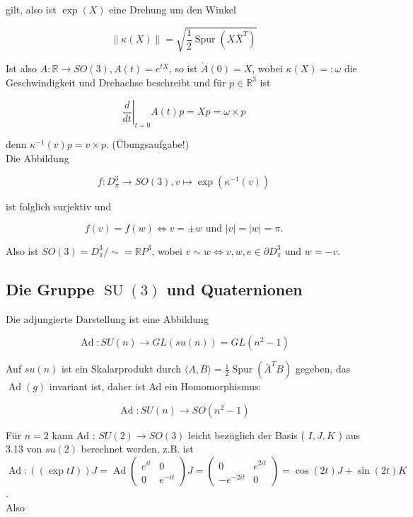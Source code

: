 \documentclass[10pt, letterpaper]{article}
\begin{document}
gilt, also ist $\exp (X)$ eine Drehung um den Winkel

$$
\|\kappa(X)\|=\sqrt{\frac{1}{2} \operatorname{Spur}\left(X \bar{X}^{T}\right)}
$$

Ist also $A: \mathbb{R} \rightarrow S O(3), A(t)=e^{t X}$, so ist $\dot{A}(0)=X$, wobei $\kappa(X)=: \omega$ die Geschwindigkeit und Drehachse beschreibt und für $p \in \mathbb{R}^{3}$ ist

$$
\left.\frac{d}{d t}\right|_{t=0} A(t) p=X p=\omega \times p
$$

denn $\kappa^{-1}(v) p=v \times p$. (Übungsaufgabe!)\\
Die Abbildung

$$
f: D_{\pi}^{3} \rightarrow S O(3), v \mapsto \exp \left(\kappa^{-1}(v)\right)
$$

ist folglich surjektiv und

$$
f(v)=f(w) \Leftrightarrow v= \pm w \text { und }|v|=|w|=\pi .
$$

Also ist $S O(3)=D_{\pi}^{3} / \sim=\mathbb{R} P^{3}$, wobei $v \sim w \Leftrightarrow v, w, e \in \partial D_{\pi}^{3}$ und $w=-v$.



\subsection{Die Gruppe $\operatorname{SU}(3)$ und Quaternionen}

Die adjungierte Darstellung ist eine Abbildung

$$
\operatorname{Ad}: S U(n) \rightarrow G L(s u(n))=G L\left(n^{2}-1\right)
$$

Auf $s u(n)$ ist ein Skalarprodukt durch $\langle A, B\rangle=\frac{1}{2} \operatorname{Spur}\left(\bar{A}^{T} B\right)$ gegeben, das $\operatorname{Ad}(g)$ invariant ist, daher ist Ad ein Homomorphismus:

$$
\operatorname{Ad}: S U(n) \rightarrow S O\left(n^{2}-1\right)
$$

Für $n=2$ kann Ad : $S U(2) \rightarrow S O(3)$ leicht bezüglich der Basis ( $I, J, K$ ) aus 3.13 von $s u(2)$ berechnet werden, z.B. ist\\
$\operatorname{Ad}:((\exp t I)) J=\operatorname{Ad}\left(\begin{array}{cc}e^{i t} & 0 \\ 0 & e^{-i t}\end{array}\right) J=\left(\begin{array}{cc}0 & e^{2 i t} \\ -e^{-2 i t} & 0\end{array}\right)=\cos (2 t) J+\sin (2 t) K$.\\
Also
\end{document}
